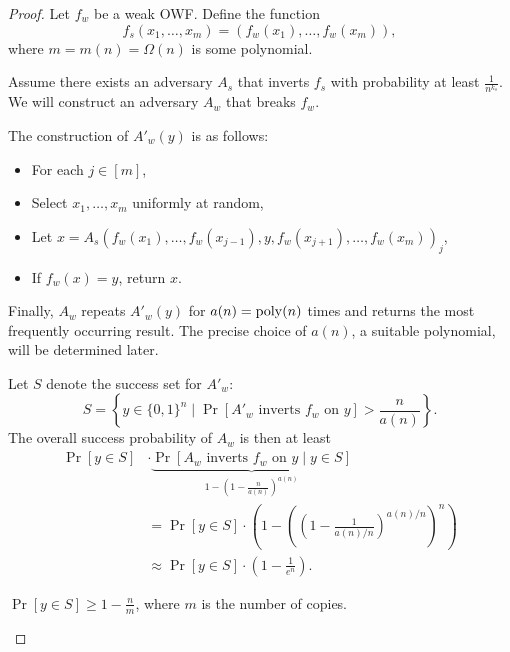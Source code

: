 \begin{proof}
    Let $f_w$ be a weak OWF.
    Define the function
    \[
        f_s(x_1, \ldots, x_m) = (f_w(x_1), \ldots, f_w(x_m)),
    \]
    where $m = m(n) = \Omega(n)$ is some polynomial.

    Assume there exists an adversary $A_s$ that inverts $f_s$ with probability at least $\frac{1}{n^{k_s}}$.
    We will construct an adversary $A_w$ that breaks $f_w$.
    
    The construction of $A'_w(y)$ is as follows:
    \begin{itemize}
        \item For each $j \in [m]$,
        \item Select $x_1, \ldots, x_m$ uniformly at random,
        \item Let $x = A_s(f_w(x_1), \ldots, f_w(x_{j - 1}), y, f_w(x_{j + 1}), \ldots, f_w(x_m))_j$,
        \item If $f_w(x) = y$, return $x$.
    \end{itemize}
    
    Finally, $A_w$ repeats $A'_w(y)$ for $a(n) = \operatorname{poly}(n)$ times and returns the most frequently occurring result.
    The precise choice of $a(n)$, a suitable polynomial, will be determined later.

    Let $S$ denote the success set for $A'_w$:
    \[
        S = \left\{y \in \{0, 1\}^n \mid \Pr[A'_w \text{ inverts } f_w \text{ on } y] > \frac{n}{a(n)}\right\}.
    \]
    The overall success probability of $A_w$ is then at least
    \begin{align*}
        \Pr[y \in S] &\cdot \underbrace{\Pr[A_w \text{ inverts } f_w \text{ on } y \mid y \in S]}_{1 - (1 - \frac{n}{a(n)})^{a(n)}}\\
					 &= \Pr[y \in S] \cdot \left( 1 - \left(\left( 1 - \frac{1}{a(n) / n} \right)^{a(n) / n}\right)^{n}  \right) \\
					 &\approx \Pr[y \in S] \cdot \left(1 - \frac{1}{e^n}\right).
    \end{align*}

    \begin{claim}
        $\Pr[y \in S] \geq 1 - \frac{n}{m}$, where $m$ is the number of copies.
    \end{claim}
    

\end{proof}

